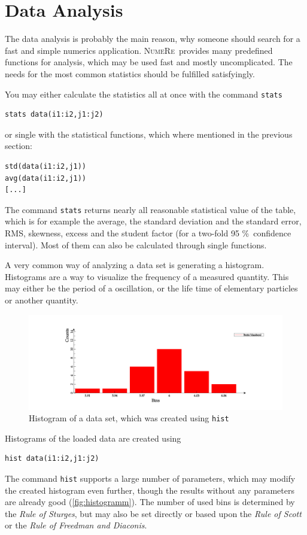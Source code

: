 \documentclass[DIV=14,headsepline,footsepline]{scrbook}
\newcommand{\NR}{\textsc{Nu\-me\-Re}}
\begin{document}
			\section{Data Analysis}
				The data analysis is probably the main reason, why someone should search for a fast and simple numerics application. \NR\ provides many predefined functions for analysis, which may be used fast and mostly uncomplicated. The needs for the most common statistics should be fulfilled satisfyingly.
				
				You may either calculate the statistics all at once with the command \verb+stats+
				\begin{lstlisting}
stats data(i1:i2,j1:j2)
				\end{lstlisting}
				or single with the statistical functions, which where mentioned in the previous section:
				\begin{lstlisting}
std(data(i1:i2,j1))
avg(data(i1:i2,j1))
[...]
				\end{lstlisting}
				The command \verb+stats+ returns nearly all reasonable statistical value of the table, which is for example the average, the standard deviation and the standard error, RMS, skewness, excess and the student factor (for a two-fold 95 \%\ confidence interval). Most of them can also be calculated through single functions.
				
				A very common way of analyzing a data set is generating a histogram. Histograms are a way to visualize the frequency of a measured quantity. This may either be the period of a oscillation, or the life time of elementary particles or another quantity.
				\begin{figure}[htb]%
					\centering
					\includegraphics[width=\textwidth]{_graphics/histogramm.png}
					\caption{Histogram of a data set, which was created using \texttt{hist}}
					\label{fig:histogramm}
				\end{figure}
				
				Histograms of the loaded data are created using 
				\begin{lstlisting}
hist data(i1:i2,j1:j2)
				\end{lstlisting}
				The command \verb+hist+ supports a large number of parameters, which may modify the created histogram even further, though the results without any parameters are already good (\autoref{fig:histogramm}). The number of used bins is determined by the \emph{Rule of Sturges}, but may also be set directly or based upon the \emph{Rule of Scott} or the \emph{Rule of Freedman and Diaconis}.
				
\end{document}

